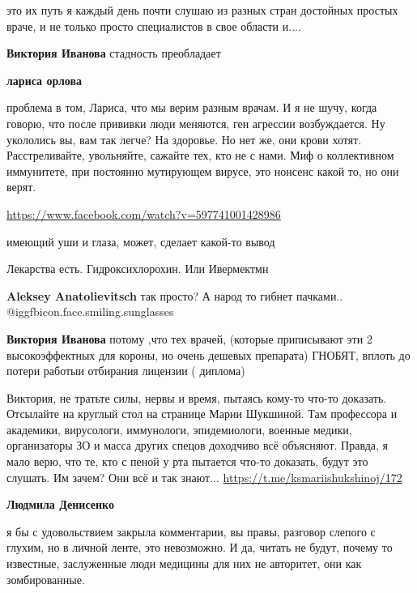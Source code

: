 \begin{itemize}
\begin{itemize}
это их путь я каждый день почти слушаю из разных стран достойных простых враче, и не только просто специалистов в свое области и....

\textbf{Виктория Иванова} стадность преобладает

\textbf{лариса орлова} 

проблема в том, Лариса, что мы верим разным врачам. И я не шучу, когда говорю,
что после прививки люди меняются, ген агрессии возбуждается. Ну укололись вы,
вам так легче? На здоровье. Но нет же, они крови хотят. Расстреливайте,
увольняйте, сажайте тех, кто не с нами. Миф о коллективном иммунитете, при
постоянно мутирующем вирусе, это нонсенс какой то, но они верят.

\end{itemize} %

\url{https://www.facebook.com/watch?v=597741001428986}

имеющий уши и глаза, может, сделает какой-то вывод

Лекарства есть.
Гидроксихлорохин.
Или Ивермектмн

\begin{itemize} %
\textbf{Aleksey Anatolievitsch} так просто? А народ то гибнет пачками..  @igg{fbicon.face.smiling.sunglasses} 

\textbf{Виктория Иванова} потому ,что тех врачей, (которые приписывают эти 2 высокоэффектных для короны, но очень дешевых препарата) ГНОБЯТ, вплоть до потери работыи отбирания лицензии ( диплома)
\end{itemize} %


Виктория, не тратьте силы, нервы и время, пытаясь кому-то что-то доказать.
Отсылайте на круглый стол на странице Марии Шукшиной. Там профессора и
академики, вирусологи, иммунологи, эпидемиологи, военные медики, организаторы
ЗО и масса других спецов доходчиво всё объясняют. Правда, я мало верю, что те,
кто с пеной у рта пытается что-то доказать, будут это слушать. Им зачем? Они
всё и так знают... \url{https://t.me/ksmariishukshinoj/172}

\begin{itemize} %
\textbf{Людмила Денисенко} 

я бы с удовольствием закрыла комментарии, вы правы, разговор слепого с глухим,
но в личной ленте, это невозможно. И да, читать не будут, почему то известные,
заслуженные люди медицины для них не авторитет, они как зомбированные.


\end{itemize}
\end{itemize}
